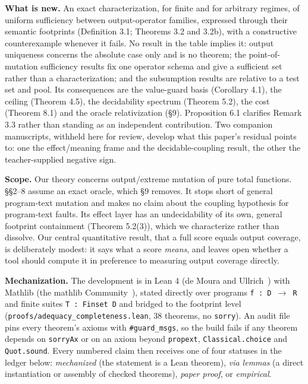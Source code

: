 \documentclass[conference]{IEEEtran}
\theoremstyle{run}
\begin{document}
\textbf{What is new.} An exact characterization, for finite and for arbitrary regimes, of uniform sufficiency between output-operator families, expressed through their semantic footprints (Definition 3.1; Theorems 3.2 and 3.2b), with a constructive counterexample whenever it fails. No result in the table implies it: output uniqueness concerns the absolute case only and is no theorem; the point-of-mutation sufficiency results fix one operator schema and give a sufficient set rather than a characterization; and the subsumption results are relative to a test set and pool. Its consequences are the value-guard basis (Corollary 4.1), the ceiling (Theorem 4.5), the decidability spectrum (Theorem 5.2), the cost (Theorem 8.1) and the oracle relativization (\S 9). Proposition 6.1 clarifies Remark 3.3 rather than standing as an independent contribution. Two companion manuscripts, withheld here for review, develop what this paper's residual points to: one the effect/meaning frame and the decidable-coupling result, the other the teacher-supplied negative sign.

\textbf{Scope.} Our theory concerns output/extreme mutation of pure total functions. \S \S 2--8 assume an exact oracle, which \S 9 removes. It stops short of general program-text mutation and makes no claim about the coupling hypothesis for program-text faults. Its effect layer has an undecidability of its own, general footprint containment (Theorem 5.2(3)), which we characterize rather than dissolve. Our central quantitative result, that a full score equals output coverage, is deliberately modest: it says what a score \emph{means}, and leaves open whether a tool should compute it in preference to measuring output coverage directly.

\textbf{Mechanization.} The development is in Lean 4 (de Moura and Ullrich~\cite{lean4}) with Mathlib (the mathlib Community~\cite{mathlib}), stated directly over programs \texttt{f : D \ensuremath{\to} R} and finite suites \texttt{T : Finset D} and bridged to the footprint level (\texttt{proofs/adequacy\_completeness.lean}, 38 theorems, no \texttt{sorry}). An audit file pins every theorem's axioms with \texttt{\#guard\_msgs}, so the build fails if any theorem depends on \texttt{sorryAx} or on an axiom beyond \texttt{propext}, \texttt{Classical.choice} and \texttt{Quot.sound}. Every numbered claim then receives one of four statuses in the ledger below: \emph{mechanized} (the statement is a Lean theorem), \emph{via lemmas} (a direct instantiation or assembly of checked theorems), \emph{paper proof}, or \emph{empirical}.
\end{document}
